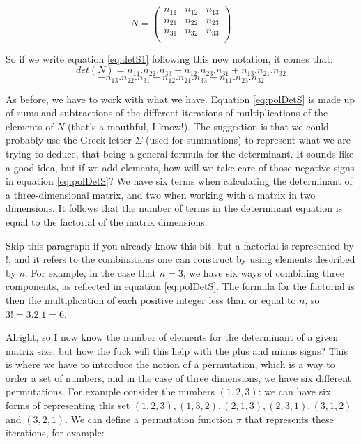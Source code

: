 \documentclass[600paper, 11pt,twoside,openany]{kdp}
\begin{document}
\[N = \begin{pmatrix}
n_{11} & n_{12} & n_{13}   \\
n_{21} & n_{22} & n_{23} \\
n_{31} & n_{32} & n_{33} \\
\end{pmatrix}\]
\par 
\vspace{-3pt}
\indent So if we write equation \ref{eq:detS1} following this new notation, it comes that:
\begin{equation}\label{eq:polDetS}
det(N) = n_{11}.n_{22}.n_{33} + n_{12}.n_{23}.n_{31} + n_{13}.n_{21}.n_{32} 		 
\end{equation}
\[ - n_{13}.n_{22}.n_{31} - n_{12}.n_{21}.n_{33} - n_{11}.n_{23}.n_{32} \]
\par 
\vspace{-3pt}
\indent As before, we have to work with what we have. Equation \ref{eq:polDetS} is made up of sums and subtractions of the different iterations of multiplications of the elements of $N$ (that’s a mouthful, I know!). The suggestion is that we could probably use the Greek letter $\Sigma$ (used for summations) to represent what we are trying to deduce, that being a general formula for the determinant. It sounds like a good idea, but if we add elements, how will we take care of those negative signs in equation \ref{eq:polDetS}? We have six terms when calculating the determinant of a three-dimensional matrix, and two when working with a matrix in two dimensions. It follows that the number of terms in the determinant equation is equal to the factorial of the matrix dimensions.
\par 
\vspace{-3pt}
\indent Skip this paragraph if you already know this bit, but a factorial is represented by $!$, and it refers to the combinations one can construct by using elements described by $n$. For example, in the case that $n=3$, we have six ways of combining three components, as reflected in equation \ref{eq:polDetS}. The formula for the factorial is then the multiplication of each positive integer less than or equal to $n$, so $3!=3.2.1=6$.
\par 
\vspace{-3pt}
\indent Alright, so I now know the number of elements for the determinant of a given matrix size, but how the fuck will this help with the plus and minus signs? This is where we have to introduce the notion of a permutation, which is a way to order a set of numbers, and in the case of three dimensions, we have six different permutations. For example consider the numbers $(1,2,3)$: we can have six forms of representing this set $(1,2,3),(1,3,2),(2,1,3),(2,3,1), (3,1,2)$ and $(3,2,1)$. We can define a permutation function $\pi$ that represents these iterations, for example:
\end{document}
